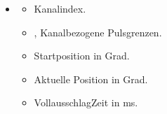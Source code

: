 \documentclass[letterpaper,10pt,english]{sphinxmanual}
\begin{document}
\begin{itemize}
\begin{description}
\begin{itemize}
\item {} 
\sphinxAtStartPar
{}  \textendash{} Maximal erlaubte Gradposition ().

\item {} 
\sphinxAtStartPar
{}  \textendash{} Minimal erlaubte Vollausschlag\sphinxhyphen{}Zeit (ms).

\item {} 
\sphinxAtStartPar
{}  \textendash{} Maximal erlaubte Vollausschlag\sphinxhyphen{}Zeit (ms).

\end{itemize}

\end{description}

\item {} \begin{description}
\begin{itemize}
\item {} 
\sphinxAtStartPar
{}  \textendash{} Kanalindex.

\item {} 
\sphinxAtStartPar
{} ,   \textendash{} Kanalbezogene Pulsgrenzen.

\item {} 
\sphinxAtStartPar
{}  \textendash{} Startposition in Grad.

\item {} 
\sphinxAtStartPar
{}  \textendash{} Aktuelle Position in Grad.

\item {} 
\sphinxAtStartPar
{}  \textendash{} Vollausschlag\sphinxhyphen{}Zeit in ms.

\end{itemize}

\end{description}

\end{itemize}
\end{document}
